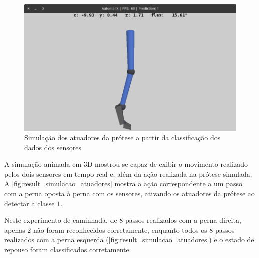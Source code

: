 \begin{figure}[ht]
	\caption{\label{fig:result_simulacao_atuadores}Simulação dos atuadores da prótese a partir da classificação dos dados dos sensores}
	\begin{center}
		\includegraphics[width=\textwidth]{resources/result_simulacao_atuadores}
	\end{center}
\end{figure}

A simulação animada em 3D mostrou-se capaz de exibir o movimento realizado pelos dois sensores em tempo real e, além da ação realizada na prótese simulada. A \autoref{fig:result_simulacao_atuadores} mostra a ação correspondente a um passo com a perna oposta à perna com os sensores, ativando os atuadores da prótese ao detectar a classe \(1\).

Neste experimento de caminhada, de \(8\) passos realizados com a perna direita, apenas \(2\) não foram reconhecidos corretamente, enquanto todos os \(8\) passos realizados com a perna esquerda (\autoref{fig:result_simulacao_atuadores}) e o estado de repouso foram classificados corretamente.